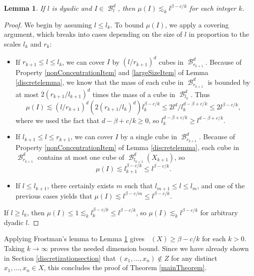 \documentclass[dvipsnames,letterpaper,12pt]{article}
\numberwithin{equation}{section}
\theoremstyle{plain}
\newtheorem{lemma}{Lemma}
\theoremstyle{remark}
\DeclareMathOperator{\hausdim}{\dim_{\mathbf{H}}}
\DeclareMathOperator{\B}{\mathcal{B}}
\begin{document}
\begin{lemma} \label{frostmanBound}
	If $l$ is dyadic and $I \in \B_l^d$, then $\mu(I) \lesssim_k l^{\beta - c/k}$ for each integer $k$.
\end{lemma}
\begin{proof}
	We begin by assuming $l \leq l_k$. To bound $\mu(I)$, we apply a covering argument, which breaks into cases depending on the size of $l$ in proportion to the scales $l_k$ and $r_k$:
	\begin{itemize}
		\item If $r_{k+1} \leq l \leq l_k$, we can cover $I$ by $(l/r_{k+1})^d$ cubes in $\B^d_{r_{k+1}}$. Because of Property \ref{nonConcentrationItem} and \ref{largeSizeItem} of Lemma \ref{discretelemma}, we know that the mass of each cube in $\B^d_{r_{k+1}}$ is bounded by at most $2 (r_{k+1}/l_{k+1})^d$ times the mass of a cube in $\B_{l_k}^d$. Thus
		\[ \mu(I) \lesssim (l/r_{k+1})^d (2(r_{k+1}/l_k)^d) l_k^{\beta - c/k} \leq 2l^d/l_k^{d - \beta + c/k} \leq 2l^{\beta - c/k}, \]
		where we used the fact that $d - \beta + c/k \geq 0$, so $l_k^{d - \beta + c/k} \geq l^{d - \beta + c/k}$.

		\item If $l_{k+1} \leq l \leq r_{k+1}$, we can cover $I$ by a single cube in $\B^d_{r_{k+1}}$. Because of Property \ref{nonConcentrationItem} of Lemma \ref{discretelemma}, each cube in $\B^d_{r_{k+1}}$ contains at most one cube of $\B^d_{l_{k+1}}(X_{k+1})$, so
		\[ \mu(I) \lesssim l_{k+1}^{\beta - c/k} \leq l^{\beta - c/k}. \]

		\item If $l \leq l_{k+1}$, there certainly exists $m$ such that $l_{m+1} \leq l \leq l_m$, and one of the previous cases yields that $\mu(I) \lesssim l^{\beta - c/m} \leq l^{\beta - c/k}$.
	\end{itemize}
	If $l \geq l_k$, then $\mu(I) \leq 1 \lesssim_k l_k^{\beta - c/k} \leq l^{\beta - c/k}$, so $\mu(I) \lesssim_k l^{\beta - c/k}$ for arbitrary dyadic $l$.
\end{proof}

Applying Frostman's lemma to Lemma \ref{frostmanBound} gives $\hausdim(X) \geq \beta - c/k$ for each $k > 0$. Taking $k \to \infty$ proves the needed dimension bound. Since we have already shown in Section \ref{discretizationsection} that $(x_1, \dots, x_n) \not \in Z$ for any distinct $x_1, \dots, x_n \in X$, this concludes the proof of Theorem \ref{mainTheorem}.
\end{document}
